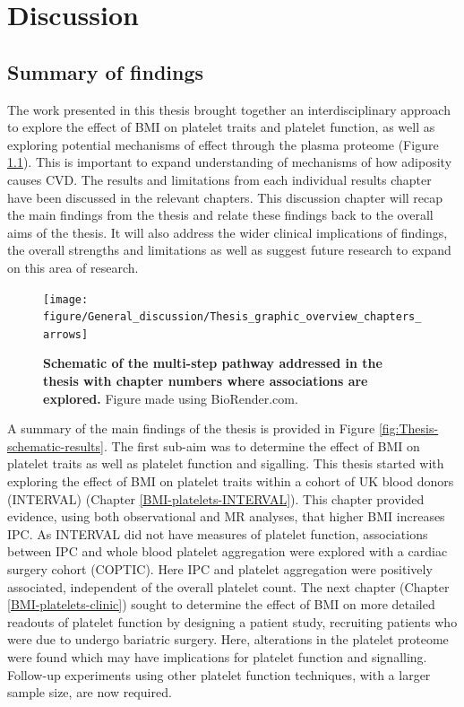 \documentclass[11pt,twoside]{bristolthesis}
\begin{document}
\hypertarget{Discussion}{%
\chapter{Discussion}\label{Discussion}}

\hypertarget{summary-of-findings}{%
\section{Summary of findings}\label{summary-of-findings}}

The work presented in this thesis brought together an interdisciplinary approach to explore the effect of BMI on platelet traits and platelet function, as well as exploring potential mechanisms of effect through the plasma proteome (Figure \ref{fig:Thesis-schematic-chaps}). This is important to expand understanding of mechanisms of how adiposity causes CVD. The results and limitations from each individual results chapter have been discussed in the relevant chapters. This discussion chapter will recap the main findings from the thesis and relate these findings back to the overall aims of the thesis. It will also address the wider clinical implications of findings, the overall strengths and limitations as well as suggest future research to expand on this area of research.



\begin{figure}

{\centering \texttt{[image: figure/General\_discussion/Thesis\_graphic\_overview\_chapters\_arrows]} 

}

\caption[Schematic of the multi-step pathway addressed in the thesis with chapter numbers where associations are explored]{\textbf{Schematic of the multi-step pathway addressed in the thesis with chapter numbers where associations are explored.} Figure made using BioRender.com.}\label{fig:Thesis-schematic-chaps}
\end{figure}
A summary of the main findings of the thesis is provided in Figure \ref{fig:Thesis-schematic-results}. The first sub-aim was to determine the effect of BMI on platelet traits as well as platelet function and sigalling. This thesis started with exploring the effect of BMI on platelet traits within a cohort of UK blood donors (INTERVAL) (Chapter \ref{BMI-platelets-INTERVAL}). This chapter provided evidence, using both observational and MR analyses, that higher BMI increases IPC. As INTERVAL did not have measures of platelet function, associations between IPC and whole blood platelet aggregation were explored with a cardiac surgery cohort (COPTIC). Here IPC and platelet aggregation were positively associated, independent of the overall platelet count. The next chapter (Chapter \ref{BMI-platelets-clinic}) sought to determine the effect of BMI on more detailed readouts of platelet function by designing a patient study, recruiting patients who were due to undergo bariatric surgery. Here, alterations in the platelet proteome were found which may have implications for platelet function and signalling. Follow-up experiments using other platelet function techniques, with a larger sample size, are now required.
\end{document}
